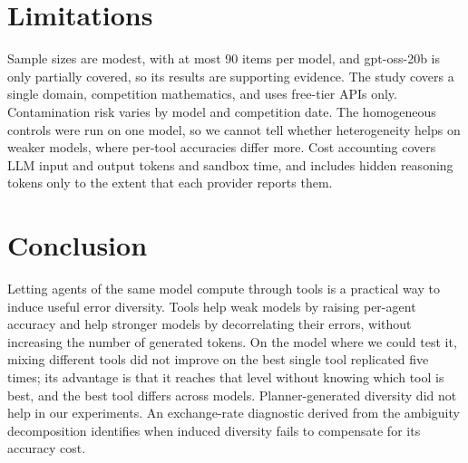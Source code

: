 \documentclass[11pt]{article}
\begin{document}
\section{Limitations}
Sample sizes are modest, with at most 90 items per model, and gpt-oss-20b is only partially
covered, so its results are supporting evidence. The study covers a single domain, competition
mathematics, and uses free-tier APIs only. Contamination risk varies by model and competition
date. The homogeneous controls were run on one model, so we cannot tell whether heterogeneity
helps on weaker models, where per-tool accuracies differ more. Cost accounting covers LLM input
and output tokens and sandbox time, and includes hidden reasoning tokens only to the extent that
each provider reports them.

\section{Conclusion}
Letting agents of the same model compute through tools is a practical way to induce useful error
diversity. Tools help weak models by raising per-agent accuracy and help stronger models by
decorrelating their errors, without increasing the number of generated tokens. On the model where
we could test it, mixing different tools did not improve on the best single tool replicated five
times; its advantage is that it reaches that level without knowing which tool is best, and the
best tool differs across models. Planner-generated diversity did not help in our experiments. An
exchange-rate diagnostic derived from the ambiguity decomposition identifies when induced
diversity fails to compensate for its accuracy cost.
\end{document}
